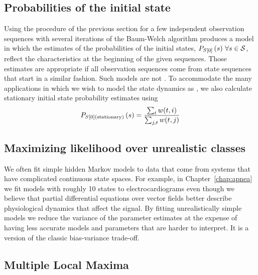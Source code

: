\subsection{Probabilities of the initial state}
\label{sec:Ps0}

Using the procedure of the previous section for a few independent
observation sequences with several iterations of the Baum-Welch
algorithm produces a model in which the estimates of the probabilities
of the initial states, $P_{\ti{S}{0}} \left(s \right)\,\forall s \in
\states$, reflect the characteristics at the beginning of the given
sequences.  Those estimates are appropriate if all observation
sequences come from state sequences that start in a similar fashion.
Such models are not .  To accommodate the many
applications in which we wish to model the state dynamics as
, we also calculate stationary initial state probability
estimates using
\begin{equation}
  \label{eq:Ps0stationary}
  P_{{S}{[0]}(\text{stationary})} \left(s \right) =
  \frac{\sum_{t}w(t,i)}{\sum_{j,t}w(t,j)}
\end{equation}



\subsection{Maximizing likelihood over unrealistic classes}
\label{sec:incredible}

We often fit simple hidden Markov models to data that come from
systems that have complicated continuous state spaces.  For example,
in Chapter~\ref{chap:apnea} we fit models with roughly 10 states to
electrocardiograms even though we believe that partial differential
equations over vector fields better describe physiological dynamics
that affect the signal.  By fitting unrealistically simple models we
reduce the variance of the parameter estimates at the expense of
having less accurate models and parameters that are harder to
interpret.  It is a version of the classic  bias-variance trade-off.

\subsection{Multiple Local Maxima}
\label{sec:MultiMax}

